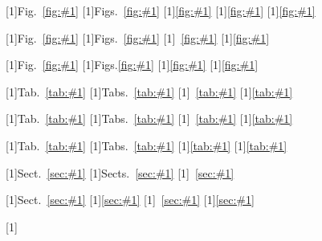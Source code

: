 [1]{Fig.~\ref{fig:#1}}
[1]{Figs.~\ref{fig:#1}}
[1]{\ref{fig:#1}}
[1]{\ref{fig:#1}}
[1]{\ref{fig:#1}}

[1]{Fig.~\ref{fig:#1}}
[1]{Figs.~\ref{fig:#1}}
[1]{~\ref{fig:#1}}
[1]{\ref{fig:#1}}

[1]{Fig.~\ref{fig:#1}}
[1]{Figs.\ref{fig:#1}}
[1]{\ref{fig:#1}}
[1]{\ref{fig:#1}}


[1]{Tab.~\ref{tab:#1}}
[1]{Tabs.~\ref{tab:#1}}
[1]{~\ref{tab:#1}}
[1]{\ref{tab:#1}}

[1]{Tab.~\ref{tab:#1}}
[1]{Tabs.~\ref{tab:#1}}
[1]{~\ref{tab:#1}}
[1]{\ref{tab:#1}}

[1]{Tab.~\ref{tab:#1}}
[1]{Tabs.~\ref{tab:#1}}
[1]{\ref{tab:#1}}
[1]{\ref{tab:#1}}



[1]{Sect.~\ref{sec:#1}}
[1]{Sects.~\ref{sec:#1}}
[1]{~\ref{sec:#1}}


[1]{Sect.~\ref{sec:#1}}
[1]{\ref{sec:#1}}
[1]{~\ref{sec:#1}}
[1]{\ref{sec:#1}}

\nc{\labsec}[1]{\label{sec:#1}}

